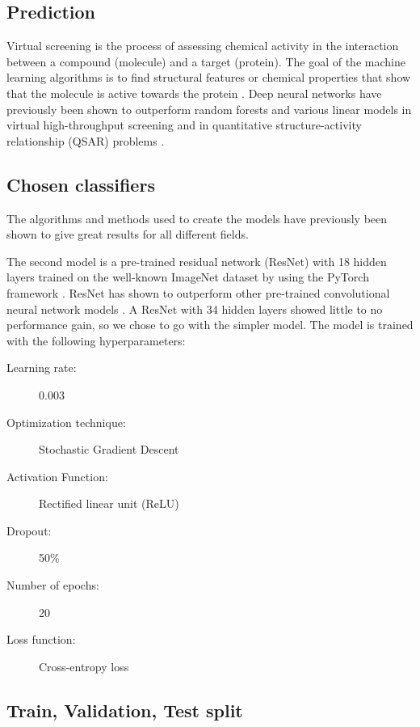 \documentclass[\ifafour a4paper,12pt,\else a5paper,10pt,\fi%
onecolumn,oneside,article,%
british%
]{memoir}
\theoremstyle{remark}
\theoremstyle{innote}
\renewcommand*{\|}[1][]{\nonscript\:#1\vert\nonscript\:\mathopen{}}
\begin{document}
\subsection{Prediction}

Virtual screening is the process of assessing chemical activity in the interaction between a compound (molecule) and a target (protein). The goal of the machine learning algorithms is to find structural features or chemical properties that show that the molecule is active towards the protein \autocites{green2019}. Deep neural networks have previously been shown to outperform random forests and various linear models in virtual high-throughput screening and in quantitative structure-activity relationship (QSAR) problems \autocite{koutsoukasetal2017}.
  
\subsection{Chosen classifiers} 

The algorithms and methods used to create the models have previously been shown to give great results for all different fields.
  
The second model is a pre-trained residual network (ResNet) \autocites{heetal2016} with 18 hidden layers trained on the well-known ImageNet dataset  \autocites{russakovskyetal2015} by using the PyTorch framework \autocites{paszkeetal2019}. ResNet has shown to outperform other pre-trained convolutional neural network models \autocites{heetal2016}. A ResNet with 34 hidden layers showed little to no performance gain, so we chose to go with the simpler model. The model is trained with the following hyperparameters:
\begin{description}
    \item[Learning rate:] 0.003 
    \item[Optimization technique:] Stochastic Gradient Descent 
    \item[Activation Function:] Rectified linear unit (ReLU) 
    \item[Dropout:] 50\% 
    \item[Number of epochs:] 20 
    \item[Loss function:] Cross-entropy loss
\end{description}

\subsection{Train, Validation, Test split}
\end{document}
